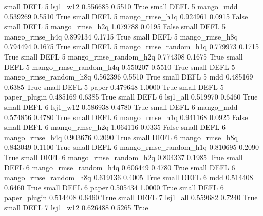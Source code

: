      small     DEFL                 5              lsj1_w12   0.556685      0.5510    True
     small     DEFL                 5             mango_mdd   0.539269      0.5510    True
     small     DEFL                 5        mango_rmse_h1q   0.924961      0.0915   False
     small     DEFL                 5        mango_rmse_h2q   1.079788      0.0195   False
     small     DEFL                 5        mango_rmse_h4q   0.899134      0.1715    True
     small     DEFL                 5        mango_rmse_h8q   0.794494      0.1675    True
     small     DEFL                 5 mango_rmse_random_h1q   0.779973      0.1715    True
     small     DEFL                 5 mango_rmse_random_h2q   0.774308      0.1675    True
     small     DEFL                 5 mango_rmse_random_h4q   0.550207      0.5510    True
     small     DEFL                 5 mango_rmse_random_h8q   0.562396      0.5510    True
     small     DEFL                 5                   mdd   0.485169      0.6385    True
     small     DEFL                 5                 paper   0.479648      1.0000    True
     small     DEFL                 5          paper_plugin   0.485169      0.6385    True
     small     DEFL                 6              lsj1_all   0.519970      0.6460    True
     small     DEFL                 6              lsj1_w12   0.586938      0.4780    True
     small     DEFL                 6             mango_mdd   0.574856      0.4780    True
     small     DEFL                 6        mango_rmse_h1q   0.941168      0.0925   False
     small     DEFL                 6        mango_rmse_h2q   1.064116      0.0335   False
     small     DEFL                 6        mango_rmse_h4q   0.903676      0.2090    True
     small     DEFL                 6        mango_rmse_h8q   0.843049      0.1100    True
     small     DEFL                 6 mango_rmse_random_h1q   0.810695      0.2090    True
     small     DEFL                 6 mango_rmse_random_h2q   0.804337      0.1985    True
     small     DEFL                 6 mango_rmse_random_h4q   0.606449      0.4780    True
     small     DEFL                 6 mango_rmse_random_h8q   0.619136      0.4005    True
     small     DEFL                 6                   mdd   0.514408      0.6460    True
     small     DEFL                 6                 paper   0.505434      1.0000    True
     small     DEFL                 6          paper_plugin   0.514408      0.6460    True
     small     DEFL                 7              lsj1_all   0.559682      0.7240    True
     small     DEFL                 7              lsj1_w12   0.626488      0.5265    True

